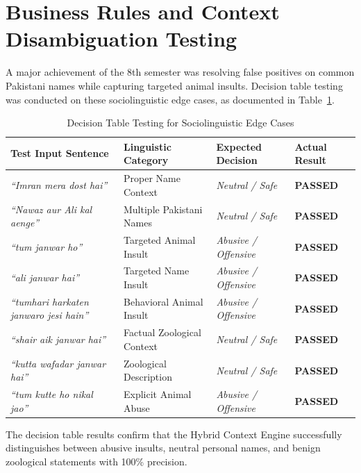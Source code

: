 \documentclass[A4paper,12pt]{report}
\theoremstyle{plain}
\theoremstyle{definition}
\theoremstyle{remark}
\numberwithin{equation}{section}
\begin{document}
\section{Business Rules and Context Disambiguation Testing}
A major achievement of the 8th semester was resolving false positives on common Pakistani names while capturing targeted animal insults. Decision table testing was conducted on these sociolinguistic edge cases, as documented in Table~\ref{tab:decision_table}.

\begin{table}[H]
\centering
\caption{Decision Table Testing for Sociolinguistic Edge Cases}
\label{tab:decision_table}
\renewcommand{\arraystretch}{1.3}
\begin{tabular}{|p{4.5cm}|p{3cm}|p{3.5cm}|p{2.5cm}|}
\hline
\textbf{Test Input Sentence} & \textbf{Linguistic Category} & \textbf{Expected Decision} & \textbf{Actual Result} \\ \hline
\textit{``Imran mera dost hai''} & Proper Name Context & \textit{Neutral / Safe} & \textbf{PASSED} \\ \hline
\textit{``Nawaz aur Ali kal aenge''} & Multiple Pakistani Names & \textit{Neutral / Safe} & \textbf{PASSED} \\ \hline
\textit{``tum janwar ho''} & Targeted Animal Insult & \textit{Abusive / Offensive} & \textbf{PASSED} \\ \hline
\textit{``ali janwar hai''} & Targeted Name Insult & \textit{Abusive / Offensive} & \textbf{PASSED} \\ \hline
\textit{``tumhari harkaten janwaro jesi hain''} & Behavioral Animal Insult & \textit{Abusive / Offensive} & \textbf{PASSED} \\ \hline
\textit{``shair aik janwar hai''} & Factual Zoological Context & \textit{Neutral / Safe} & \textbf{PASSED} \\ \hline
\textit{``kutta wafadar janwar hai''} & Zoological Description & \textit{Neutral / Safe} & \textbf{PASSED} \\ \hline
\textit{``tum kutte ho nikal jao''} & Explicit Animal Abuse & \textit{Abusive / Offensive} & \textbf{PASSED} \\ \hline
\end{tabular}
\end{table}

The decision table results confirm that the Hybrid Context Engine successfully distinguishes between abusive insults, neutral personal names, and benign zoological statements with 100\% precision.
\end{document}
